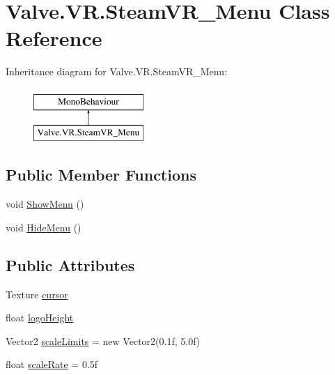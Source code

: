 \hypertarget{class_valve_1_1_v_r_1_1_steam_v_r___menu}{}\section{Valve.\+V\+R.\+Steam\+V\+R\+\_\+\+Menu Class Reference}
\label{class_valve_1_1_v_r_1_1_steam_v_r___menu}
Inheritance diagram for Valve.\+V\+R.\+Steam\+V\+R\+\_\+\+Menu\+:\begin{figure}[H]
\begin{center}
\leavevmode
\includegraphics[height=2.000000cm]{class_valve_1_1_v_r_1_1_steam_v_r___menu}
\end{center}
\end{figure}
\subsection*{Public Member Functions}
\begin{DoxyCompactItemize}
\item 
void \mbox{\hyperlink{class_valve_1_1_v_r_1_1_steam_v_r___menu_a4c23a751292b781004745d870d6157b6}{Show\+Menu}} ()
\item 
void \mbox{\hyperlink{class_valve_1_1_v_r_1_1_steam_v_r___menu_ae2237ecbd2db4185cbe6339ee44bdd62}{Hide\+Menu}} ()
\end{DoxyCompactItemize}
\subsection*{Public Attributes}
\begin{DoxyCompactItemize}
\item 
Texture \mbox{\hyperlink{class_valve_1_1_v_r_1_1_steam_v_r___menu_a5735ce5c311eae97cd73bf74144c470e}{cursor}}
\item 
float \mbox{\hyperlink{class_valve_1_1_v_r_1_1_steam_v_r___menu_a9b20d60f0e9b1aa1c35c4ab29035783f}{logo\+Height}}
\item 
Vector2 \mbox{\hyperlink{class_valve_1_1_v_r_1_1_steam_v_r___menu_a4d51b869eec84902bdfbae283c838d9a}{scale\+Limits}} = new Vector2(0.\+1f, 5.\+0f)
\item 
float \mbox{\hyperlink{class_valve_1_1_v_r_1_1_steam_v_r___menu_a3764ae548445b4ca2fb5a7bae4360174}{scale\+Rate}} = 0.\+5f
\end{DoxyCompactItemize}

